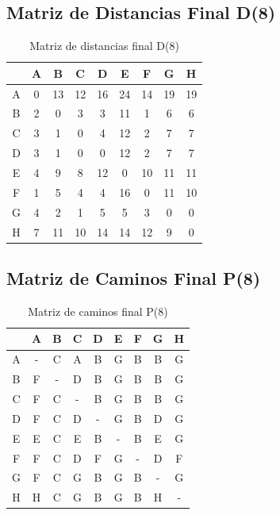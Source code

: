 \documentclass[12pt]{article}
\begin{document}
\subsection{Matriz de Distancias Final D(8)}
\begin{table}[h!]
\centering
\begin{tabular}{|c|c|c|c|c|c|c|c|c|}
\hline
 & A & B & C & D & E & F & G & H \\\hline
A & 0 & 13 & 12 & 16 & 24 & 14 & 19 & 19 \\\hline
B & 2 & 0 & 3 & 3 & 11 & 1 & 6 & 6 \\\hline
C & 3 & 1 & 0 & 4 & 12 & 2 & 7 & 7 \\\hline
D & 3 & 1 & 0 & 0 & 12 & 2 & 7 & 7 \\\hline
E & 4 & 9 & 8 & 12 & 0 & 10 & 11 & 11 \\\hline
F & 1 & 5 & 4 & 4 & 16 & 0 & 11 & 10 \\\hline
G & 4 & 2 & 1 & 5 & 5 & 3 & 0 & 0 \\\hline
H & 7 & 11 & 10 & 14 & 14 & 12 & 9 & 0 \\\hline
\end{tabular}
\caption{Matriz de distancias final D(8)}
\end{table}

\clearpage
\subsection{Matriz de Caminos Final P(8)}
\begin{table}[h!]
\centering
\begin{tabular}{|c|c|c|c|c|c|c|c|c|}
\hline
 & A & B & C & D & E & F & G & H \\\hline
A & - & C & A & B & G & B & B & G \\\hline
B & F & - & D & B & G & B & B & G \\\hline
C & F & C & - & B & G & B & B & G \\\hline
D & F & C & D & - & G & B & D & G \\\hline
E & E & C & E & B & - & B & E & G \\\hline
F & F & C & D & F & G & - & D & F \\\hline
G & F & C & G & B & G & B & - & G \\\hline
H & H & C & G & B & G & B & H & - \\\hline
\end{tabular}
\caption{Matriz de caminos final P(8)}
\end{table}
\end{document}

